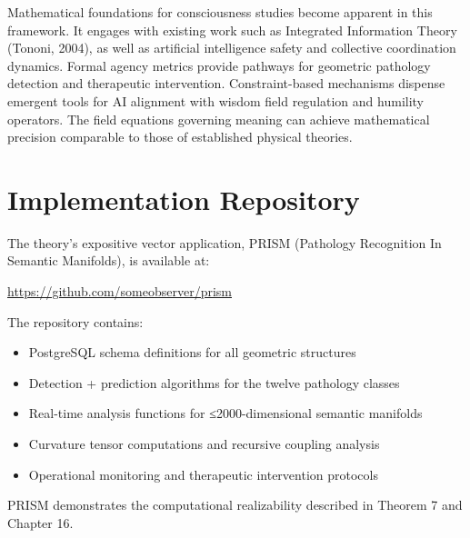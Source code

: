 \documentclass[11pt, a4paper]{report}
\begin{document}
Mathematical foundations for consciousness studies become apparent in this framework. It engages with existing work such as Integrated Information Theory (Tononi, 2004), as well as artificial intelligence safety and collective coordination dynamics. Formal agency metrics provide pathways for geometric pathology detection and therapeutic intervention. Constraint-based mechanisms dispense emergent tools for AI alignment with wisdom field regulation and humility operators. The field equations governing meaning can achieve mathematical precision comparable to those of established physical theories.

\tableofcontents

















\appendix
\chapter{Implementation Repository}
\label{appendix:implementation}

The theory's expositive vector application, PRISM (Pathology Recognition In Semantic Manifolds), is available at:

\begin{center}
\url{https://github.com/someobserver/prism}
\end{center}

The repository contains:
\begin{itemize}
\item PostgreSQL schema definitions for all geometric structures
\item Detection + prediction algorithms for the twelve pathology classes
\item Real-time analysis functions for ≤2000-dimensional semantic manifolds
\item Curvature tensor computations and recursive coupling analysis
\item Operational monitoring and therapeutic intervention protocols
\end{itemize}

PRISM demonstrates the computational realizability described in Theorem 7 and Chapter 16.

\printbibliography
\end{document}
